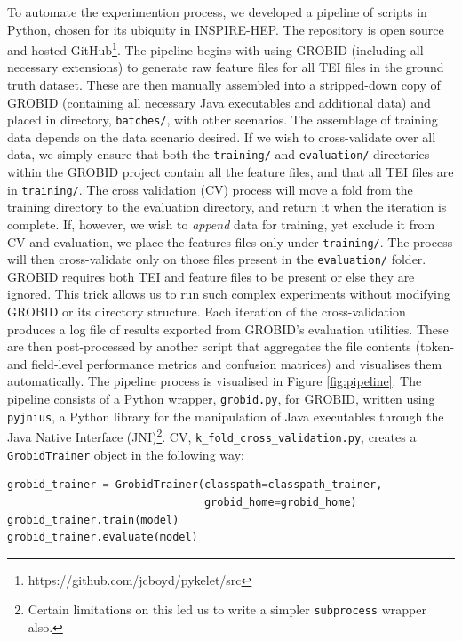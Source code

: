 To automate the experimention process, we developed a pipeline of scripts in Python, chosen for its ubiquity in INSPIRE-HEP. The repository is open source and hosted GitHub\footnote{https://github.com/jcboyd/pykelet/src}. The pipeline begins with using GROBID (including all necessary extensions) to generate raw feature files for all TEI files in the ground truth dataset. These are then manually assembled into a stripped-down copy of GROBID (containing all necessary Java executables and additional data) and placed in directory, \texttt{batches/}, with other scenarios. The assemblage of training data depends on the data scenario desired. If we wish to cross-validate over all data, we simply ensure that both the \texttt{training/} and \texttt{evaluation/} directories within the GROBID project contain all the feature files, and that all TEI files are in \texttt{training/}. The cross validation (CV) process will move a fold from the training directory to the evaluation directory, and return it when the iteration is complete. If, however, we wish to \emph{append} data for training, yet exclude it from CV and evaluation, we place the features files only under \texttt{training/}. The process will then cross-validate only on those files present in the \texttt{evaluation/} folder. GROBID requires both TEI and feature files to be present or else they are ignored. This trick allows us to run such complex experiments without modifying GROBID or its directory structure. Each iteration of the cross-validation produces a log file of results exported from GROBID's evaluation utilities. These are then post-processed by another script that aggregates the file contents (token- and field-level performance metrics and confusion matrices) and visualises them automatically. The pipeline process is visualised in Figure \ref{fig:pipeline}. The pipeline consists of a Python wrapper, \texttt{grobid.py}, for GROBID, written using \texttt{pyjnius}, a Python library for the manipulation of Java executables through the Java Native Interface (JNI)\footnote{Certain limitations on this led us to write a simpler \texttt{subprocess} wrapper also.}. CV, \texttt{k\_fold\_cross\_validation.py}, creates a \texttt{GrobidTrainer} object in the following way:\\

\begin{lstlisting}[language=python, caption=Excerpt from our Python wrapper for GROBID, label={lst:grobid}]
grobid_trainer = GrobidTrainer(classpath=classpath_trainer,
                               grobid_home=grobid_home)
grobid_trainer.train(model)
grobid_trainer.evaluate(model)
\end{lstlisting}

